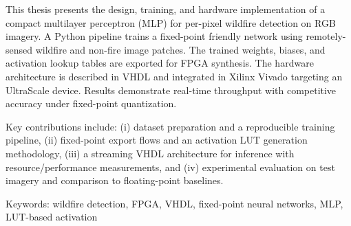 This thesis presents the design, training, and hardware implementation of a compact multilayer perceptron (MLP) for per-pixel wildfire detection on RGB imagery. A Python pipeline trains a fixed-point friendly network using remotely-sensed wildfire and non-fire image patches. The trained weights, biases, and activation lookup tables are exported for FPGA synthesis. The hardware architecture is described in VHDL and integrated in Xilinx Vivado targeting an UltraScale device. Results demonstrate real-time throughput with competitive accuracy under fixed-point quantization.

Key contributions include: (i) dataset preparation and a reproducible training pipeline, (ii) fixed-point export flows and an activation LUT generation methodology, (iii) a streaming VHDL architecture for inference with resource/performance measurements, and (iv) experimental evaluation on test imagery and comparison to floating-point baselines.

Keywords: wildfire detection, FPGA, VHDL, fixed-point neural networks, MLP, LUT-based activation
